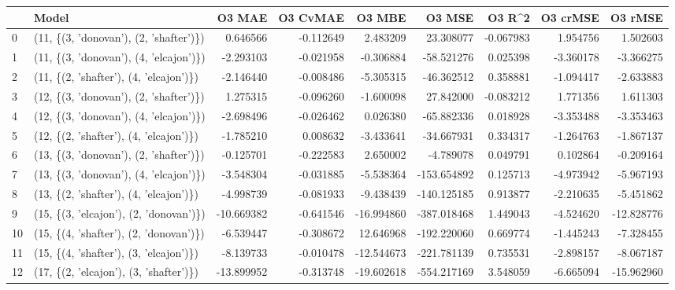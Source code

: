 \begin{tabular}{llrrrrrrr}
\toprule
{} &                                   Model &     O3 MAE &  O3 CvMAE &     O3 MBE &      O3 MSE &    O3 R\textasciicircum2 &  O3 crMSE &    O3 rMSE \\
\midrule
0  &  (11, \{(3, 'donovan'), (2, 'shafter')\}) &   0.646566 & -0.112649 &   2.483209 &   23.308077 & -0.067983 &  1.954756 &   1.502603 \\
1  &  (11, \{(3, 'donovan'), (4, 'elcajon')\}) &  -2.293103 & -0.021958 &  -0.306884 &  -58.521276 &  0.025398 & -3.360178 &  -3.366275 \\
2  &  (11, \{(2, 'shafter'), (4, 'elcajon')\}) &  -2.146440 & -0.008486 &  -5.305315 &  -46.362512 &  0.358881 & -1.094417 &  -2.633883 \\
3  &  (12, \{(3, 'donovan'), (2, 'shafter')\}) &   1.275315 & -0.096260 &  -1.600098 &   27.842000 & -0.083212 &  1.771356 &   1.611303 \\
4  &  (12, \{(3, 'donovan'), (4, 'elcajon')\}) &  -2.698496 & -0.026462 &   0.026380 &  -65.882336 &  0.018928 & -3.353488 &  -3.353463 \\
5  &  (12, \{(2, 'shafter'), (4, 'elcajon')\}) &  -1.785210 &  0.008632 &  -3.433641 &  -34.667931 &  0.334317 & -1.264763 &  -1.867137 \\
6  &  (13, \{(3, 'donovan'), (2, 'shafter')\}) &  -0.125701 & -0.222583 &   2.650002 &   -4.789078 &  0.049791 &  0.102864 &  -0.209164 \\
7  &  (13, \{(3, 'donovan'), (4, 'elcajon')\}) &  -3.548304 & -0.031885 &  -5.538364 & -153.654892 &  0.125713 & -4.973942 &  -5.967193 \\
8  &  (13, \{(2, 'shafter'), (4, 'elcajon')\}) &  -4.998739 & -0.081933 &  -9.438439 & -140.125185 &  0.913877 & -2.210635 &  -5.451862 \\
9  &  (15, \{(3, 'elcajon'), (2, 'donovan')\}) & -10.669382 & -0.641546 & -16.994860 & -387.018468 &  1.449043 & -4.524620 & -12.828776 \\
10 &  (15, \{(4, 'shafter'), (2, 'donovan')\}) &  -6.539447 & -0.308672 &  12.646968 & -192.220060 &  0.669774 & -1.445243 &  -7.328455 \\
11 &  (15, \{(4, 'shafter'), (3, 'elcajon')\}) &  -8.139733 & -0.010478 & -12.544673 & -221.781139 &  0.735531 & -2.898157 &  -8.067187 \\
12 &  (17, \{(2, 'elcajon'), (3, 'shafter')\}) & -13.899952 & -0.313748 & -19.602618 & -554.217169 &  3.548059 & -6.665094 & -15.962960 \\

\end{tabular}
